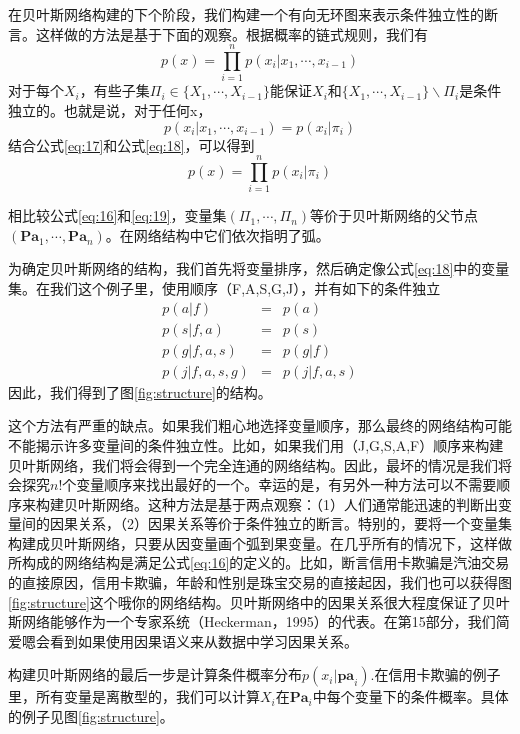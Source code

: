 \documentclass[10pt,a4paper]{article}
\begin{document}
\begin{CJK*}{UTF8}{gkai}
在贝叶斯网络构建的下个阶段，我们构建一个有向无环图来表示条件独立性的断言。这样做的方法是基于下面的观察。根据概率的链式规则，我们有
\begin{equation}
\label{eq:17}
p(x)=\prod_{i=1}^n p(x_i|x_1,\cdots,x_{i-1})
\end{equation}
对于每个$X_i$，有些子集$\Pi_i \in \{X_1,\cdots,X_{i-1}\}$能保证$X_i$和$\{X_1,\cdots,X_{i-1}\} \backslash \Pi_i$是条件独立的。也就是说，对于任何x，
\begin{equation}
\label{eq:18}
p(x_i|x_1,\cdots,x_{i-1})=p(x_i|\pi_i)
\end{equation}
结合公式\ref{eq:17}和公式\ref{eq:18}，可以得到
\begin{equation}
\label{eq:19}
p(x)=\prod_{i=1}^n p(x_i|\pi_i)
\end{equation}


相比较公式\ref{eq:16}和\ref{eq:19}，变量集$(\Pi_1,\cdots,\Pi_n)$等价于贝叶斯网络的父节点$(\boldsymbol{Pa}_1,\cdots,\boldsymbol{Pa}_n)$。在网络结构中它们依次指明了弧。


为确定贝叶斯网络的结构，我们首先将变量排序，然后确定像公式\ref{eq:18}中的变量集。在我们这个例子里，使用顺序（F,A,S,G,J），并有如下的条件独立
\begin{eqnarray}
p(a|f)&=&p(a) \nonumber \\
p(s|f,a)&=&p(s) \nonumber \\
p(g|f,a,s)&=&p(g|f) \nonumber \\
p(j|f,a,s,g)&=&p(j|f,a,s)
\label{eq:20}
\end{eqnarray}
因此，我们得到了图\ref{fig:structure}的结构。


这个方法有严重的缺点。如果我们粗心地选择变量顺序，那么最终的网络结构可能不能揭示许多变量间的条件独立性。比如，如果我们用（J,G,S,A,F）顺序来构建贝叶斯网络，我们将会得到一个完全连通的网络结构。因此，最坏的情况是我们将会探究$n!$个变量顺序来找出最好的一个。幸运的是，有另外一种方法可以不需要顺序来构建贝叶斯网络。这种方法是基于两点观察：（1）人们通常能迅速的判断出变量间的因果关系，（2）因果关系等价于条件独立的断言。特别的，要将一个变量集构建成贝叶斯网络，只要从因变量画个弧到果变量。在几乎所有的情况下，这样做所构成的网络结构是满足公式\ref{eq:16}的定义的。比如，断言信用卡欺骗是汽油交易的直接原因，信用卡欺骗，年龄和性别是珠宝交易的直接起因，我们也可以获得图\ref{fig:structure}这个哦你的网络结构。贝叶斯网络中的因果关系很大程度保证了贝叶斯网络能够作为一个专家系统（Heckerman，1995）的代表。在第15部分，我们简爱嗯会看到如果使用因果语义来从数据中学习因果关系。


构建贝叶斯网络的最后一步是计算条件概率分布$p(x_i|\boldsymbol{pa}_i)$.在信用卡欺骗的例子里，所有变量是离散型的，我们可以计算$X_i$在$\boldsymbol{Pa}_i$中每个变量下的条件概率。具体的例子见图\ref{fig:structure}。



\end{CJK*}
\end{document}
